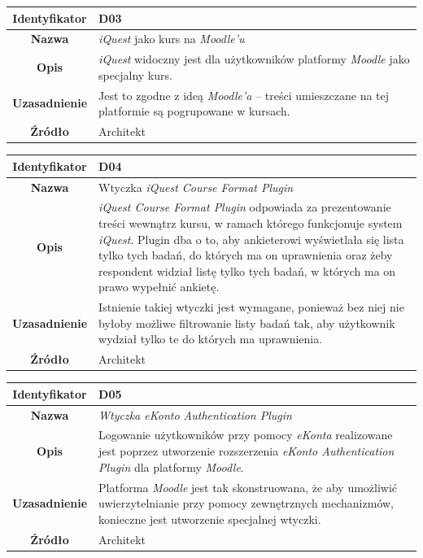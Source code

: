 \begin{table}[H]
\centering
\begin{tabular}{ | >{\bfseries}c | p{11cm} | }
\hline
%
Identyfikator & D03 \\ \hline
Nazwa & \textit{iQuest} jako kurs na \textit{Moodle'u}  \\ \hline
Opis & \textit{iQuest} widoczny jest dla użytkowników platformy \textit{Moodle} jako specjalny kurs. \\ \hline
Uzasadnienie & Jest to zgodne z ideą \textit{Moodle'a} -- treści umieszczane na tej platformie są pogrupowane w kursach. \\ \hline
Źródło & Architekt \\ \hline
%
\end{tabular}
\end{table}

\begin{table}[H]
\centering
\begin{tabular}{ | >{\bfseries}c | p{11cm} | }
\hline
%
Identyfikator & D04 \\ \hline
Nazwa & Wtyczka \textit{iQuest Course Format Plugin}  \\ \hline
Opis & \textit{iQuest Course Format Plugin} odpowiada za prezentowanie treści wewnątrz kursu, w ramach którego funkcjonuje system \textit{iQuest}. Plugin dba o to, aby ankieterowi wyświetlała się lista tylko tych badań, do których ma on uprawnienia oraz żeby respondent widział listę tylko tych badań, w których ma on prawo wypełnić ankietę. \\ \hline
Uzasadnienie & Istnienie takiej wtyczki jest wymagane, ponieważ bez niej nie byłoby możliwe filtrowanie listy badań tak, aby użytkownik wydział tylko te do których ma uprawnienia. \\ \hline
Źródło & Architekt \\ \hline
%
\end{tabular}
\end{table}

\begin{table}[H]
\centering
\begin{tabular}{ | >{\bfseries}c | p{11cm} | }
\hline
%
Identyfikator & D05 \\ \hline
Nazwa & \textit{Wtyczka eKonto Authentication Plugin}  \\ \hline
Opis & Logowanie użytkowników przy pomocy \textit{eKonta} realizowane jest poprzez utworzenie rozszerzenia \textit{eKonto Authentication Plugin} dla platformy \textit{Moodle}. \\ \hline
Uzasadnienie & Platforma \textit{Moodle} jest tak skonstruowana, że aby umożliwić uwierzytelnianie przy pomocy zewnętrznych mechanizmów, konieczne jest utworzenie specjalnej wtyczki. \\ \hline
Źródło & Architekt \\ \hline
%
\end{tabular}
\end{table}

